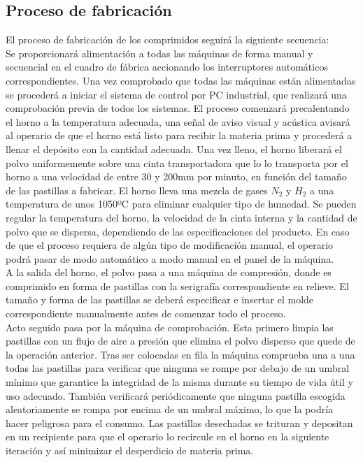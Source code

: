 \subsection{Proceso de fabricación}

El proceso de fabricación de los comprimidos seguirá la siguiente secuencia: \\

Se proporcionará alimentación a todas las máquinas de forma manual y secuencial en el cuadro de fábrica accionando los interruptores automáticos correspondientes. Una vez comprobado que todas las máquinas están alimentadas se procederá a iniciar el sistema de control por PC industrial, que realizará una comprobación previa de todos los sistemas. El proceso comenzará precalentando el horno a la temperatura adecuada, una señal de aviso visual y acústica avisará al operario de que el horno está listo para recibir la materia prima y procederá a llenar el depósito con la cantidad adecuada. Una vez lleno, el horno liberará el polvo uniformemente sobre una cinta transportadora que lo lo transporta por el horno a una velocidad de entre 30 y 200mm por minuto, en función del tamaño de las pastillas a fabricar. El horno lleva una mezcla de gases $N_2$ y $H_2$ a una temperatura de unos 1050ºC para eliminar cualquier tipo de humedad. Se pueden regular la temperatura del horno, la velocidad de la cinta interna y la cantidad de polvo que se dispersa, dependiendo de las especificaciones del producto. En caso de que el proceso requiera de algún tipo de modificación manual, el operario podrá pasar de modo automático a modo manual en el panel de la máquina.
\\

A la salida del horno, el polvo pasa a una máquina de compresión, donde es comprimido en forma de pastillas con la serigrafía correspondiente en relieve. El tamaño y forma de las pastillas se deberá especificar e insertar el molde correspondiente manualmente antes de comenzar todo el proceso. \\  

Acto seguido pasa por la máquina de comprobación. Esta primero limpia las pastillas con un flujo de aire a presión que elimina el polvo disperso que quede de la operación anterior. Tras ser colocadas en fila la máquina comprueba una a una todas las pastillas para verificar que ninguna se rompe por debajo de un umbral mínimo que garantice la integridad de la misma durante su tiempo de vida útil y uso adecuado. También verificará periódicamente que ninguna pastilla escogida aleatoriamente se rompa por encima de un umbral máximo, lo que la podría hacer peligrosa para el consumo. Las pastillas desechadas se trituran y depositan en un recipiente para que el operario lo recircule en el horno en la siguiente iteración y así minimizar el desperdicio de materia prima. \\

